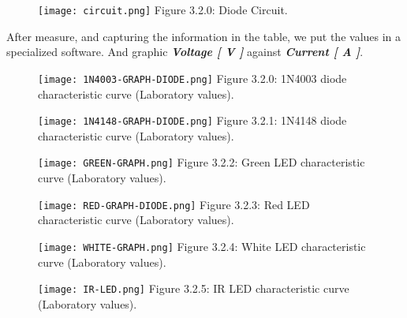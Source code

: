\documentclass[10pt,a4paper]{article}
\begin{document}
\begin{figure}[H]
\texttt{[image: circuit.png]}
\centering \linebreak \linebreak Figure 3.2.0: Diode Circuit.
\end{figure}

\pagebreak

After measure, and capturing the information in the table, we put the values in a specialized software. And graphic {\bfseries\itshape Voltage [ V ]} against {\bfseries\itshape Current [ A ]}. 

\begin{multicols}{2}
\begin{figure}[H]
\texttt{[image: 1N4003-GRAPH-DIODE.png]}
\centering \linebreak \linebreak Figure 3.2.0: 1N4003 diode characteristic curve (Laboratory values).
\end{figure}

\begin{figure}[H]
\texttt{[image: 1N4148-GRAPH-DIODE.png]}
\centering \linebreak \linebreak Figure 3.2.1: 1N4148 diode characteristic curve (Laboratory values).
\end{figure}
\end{multicols}

\begin{multicols}{2}
\begin{figure}[H]
\texttt{[image: GREEN-GRAPH.png]}
\centering \linebreak \linebreak Figure 3.2.2: Green LED characteristic curve (Laboratory values).
\end{figure}

\begin{figure}[H]
\texttt{[image: RED-GRAPH-DIODE.png]}
\centering \linebreak \linebreak Figure 3.2.3: Red LED characteristic curve (Laboratory values).
\end{figure}
\end{multicols}

\begin{multicols}{2}
\begin{figure}[H]
\texttt{[image: WHITE-GRAPH.png]}
\centering \linebreak \linebreak Figure 3.2.4: White LED characteristic curve (Laboratory values).
\end{figure}

\begin{figure}[H]
\texttt{[image: IR-LED.png]}
\centering \linebreak \linebreak Figure 3.2.5: IR LED characteristic curve (Laboratory values).
\end{figure}
\end{multicols}
\end{document}
